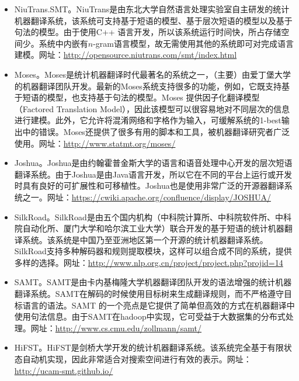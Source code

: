 \begin{itemize}
\vspace{0.5em}
\item NiuTrans.SMT。NiuTrans\cite{Tong2012NiuTrans}是由东北大学自然语言处理实验室自主研发的统计机器翻译系统，该系统可支持基于短语的模型、基于层次短语的模型以及基于句法的模型。由于使用C++ 语言开发，所以该系统运行时间快，所占存储空间少。系统中内嵌有$n$-gram语言模型，故无需使用其他的系统即可对完成语言建模。网址：\url{http://opensource.niutrans.com/smt/index.html}
\vspace{0.5em}
\item Moses。Moses\cite{Koehn2007Moses}是统计机器翻译时代最著名的系统之一，（主要）由爱丁堡大学的机器翻译团队开发。最新的Moses系统支持很多的功能，例如，它既支持基于短语的模型，也支持基于句法的模型。Moses 提供因子化翻译模型（Factored Translation Model），因此该模型可以很容易地对不同层次的信息进行建模。此外，它允许将混淆网络和字格作为输入，可缓解系统的1-best输出中的错误。Moses还提供了很多有用的脚本和工具，被机器翻译研究者广泛使用。网址：\url{http://www.statmt.org/moses/}
\vspace{0.5em}
\item Joshua。Joshua\cite{Li2010Joshua}是由约翰霍普金斯大学的语言和语音处理中心开发的层次短语翻译系统。由于Joshua是由Java语言开发，所以它在不同的平台上运行或开发时具有良好的可扩展性和可移植性。Joshua也是使用非常广泛的开源器翻译系统之一。网址：\url{https://cwiki.apache.org/confluence/display/JOSHUA/}
\vspace{0.5em}
\item SilkRoad。SilkRoad是由五个国内机构（中科院计算所、中科院软件所、中科院自动化所、厦门大学和哈尔滨工业大学）联合开发的基于短语的统计机器翻译系统。该系统是中国乃至亚洲地区第一个开源的统计机器翻译系统。SilkRoad支持多种解码器和规则提取模块，这样可以组合成不同的系统，提供多样的选择。网址：\url{http://www.nlp.org.cn/project/project.php?projid=14}
\vspace{0.5em}
\item SAMT。SAMT\cite{zollmann2007the}是由卡内基梅隆大学机器翻译团队开发的语法增强的统计机器翻译系统。SAMT在解码的时候使用目标树来生成翻译规则，而不严格遵守目标语言的语法。SAMT 的一个亮点是它提供了简单但高效的方式在机器翻译中使用句法信息。由于SAMT在hadoop中实现，它可受益于大数据集的分布式处理。网址：\url{http://www.cs.cmu.edu/zollmann/samt/}
\vspace{0.5em}
\item HiFST。HiFST\cite{iglesias2009hierarchical}是剑桥大学开发的统计机器翻译系统。该系统完全基于有限状态自动机实现，因此非常适合对搜索空间进行有效的表示。网址：\url{http://ucam-smt.github.io/}

\end{itemize}
